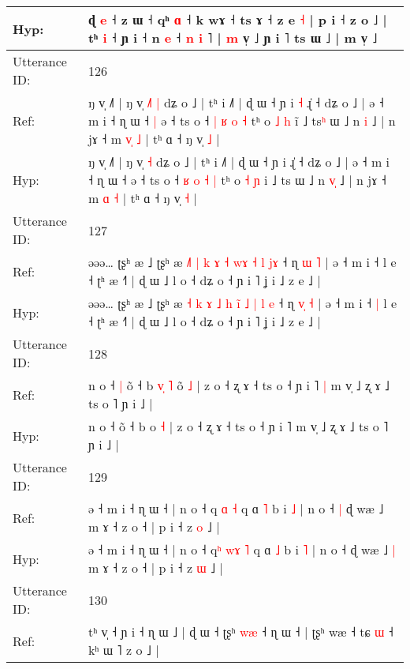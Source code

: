 \documentclass[10pt]{article}
\DeclareRobustCommand{\hl}[1]{{\textcolor{red}{#1}}}
\begin{document}
\begin{longtable}{ll}
 \\
Hyp: & ɖ \hl{e} ˧ z ɯ ˧\hl{}\hl{} qʰ \hl{}\hl{ɑ} ˧ k\hl{} wɤ ˧ ts ɤ ˧ z e \hl{˧} | p i ˧ z o ˩ | t\hl{}ʰ \hl{i} ˧ ɲ i ˧ n \hl{e} ˧\hl{ }\hl{n}\hl{ }\hl{i}\hl{ }˥ | \hl{m} v̩ ˩ ɲ i ˥ ts ɯ ˩ | m v̩ ˩
 \\
\midrule
Utterance ID: & 126 \\
Ref: & ŋ v̩ ˩˥ | ŋ v̩\hl{ }\hl{˩}\hl{˥} \hl{|} dʑ o ˩ | tʰ i ˩˥ | ɖ ɯ ˧ ɲ i\hl{ }\hl{˧} ɻ̍ ˧ dʑ o ˩ | ə ˧ m i ˧ ɳ ɯ ˧\hl{ }\hl{|} ə ˧ ts o ˧ \hl{|} \hl{ʁ} \hl{o} \hl{˧} tʰ o \hl{˩} \hl{h} i\hl{̃} ˩ ts\hl{ʰ} ɯ ˩ n \hl{}\hl{i} ˩ | n jɤ ˧ m \hl{v}\hl{̩} \hl{˩} | tʰ ɑ ˧ ŋ v̩ \hl{˩} |
 \\
Hyp: & ŋ v̩ ˩˥ | ŋ v̩\hl{}\hl{}\hl{} \hl{˧} dʑ o ˩ | tʰ i ˩˥ | ɖ ɯ ˧ ɲ i\hl{}\hl{} ɻ̍ ˧ dʑ o ˩ | ə ˧ m i ˧ ɳ ɯ ˧\hl{}\hl{} ə ˧ ts o ˧ \hl{ʁ} \hl{o} \hl{˧} \hl{|} tʰ o \hl{˧} \hl{ɲ} i\hl{} ˩ ts\hl{} ɯ ˩ n \hl{v}\hl{̩} ˩ | n jɤ ˧ m \hl{}\hl{ɑ} \hl{˧} | tʰ ɑ ˧ ŋ v̩ \hl{˧} |
 \\
\midrule
Utterance ID: & 127 \\
Ref: & əəə… ʈʂʰ æ ˩ ʈʂʰ æ \hl{˩}\hl{˥} \hl{|} \hl{k} \hl{ɤ} \hl{˧} \hl{w}\hl{ɤ} \hl{˧} \hl{l} \hl{}\hl{j}\hl{ɤ} ˧ ɳ \hl{}\hl{ɯ} \hl{˥} | ə ˧ m i ˧\hl{}\hl{} l e ˧ ʈʰ æ ˧˥ | ɖ ɯ ˩ l o ˧ dʑ o ˧ ɲ i ˥ ʝ i ˩ z e ˩ |
 \\
Hyp: & əəə… ʈʂʰ æ ˩ ʈʂʰ æ \hl{}\hl{˧} \hl{k} \hl{ɤ} \hl{˩} \hl{h} \hl{i}\hl{̃} \hl{˩} \hl{|} \hl{l}\hl{ }\hl{e} ˧ ɳ \hl{v}\hl{̩} \hl{˧} | ə ˧ m i ˧\hl{ }\hl{|} l e ˧ ʈʰ æ ˧˥ | ɖ ɯ ˩ l o ˧ dʑ o ˧ ɲ i ˥ ʝ i ˩ z e ˩ |
 \\
\midrule
Utterance ID: & 128 \\
Ref: & n o ˧\hl{ }\hl{|} õ ˧ b\hl{ }\hl{v}\hl{̩}\hl{ }\hl{˥} o\hl{̃} \hl{˩} | z o ˧ ʐ ɤ ˧ ts o ˧ ɲ i ˥\hl{ }\hl{|} m v̩ ˩ ʐ ɤ ˩ ts o ˥ ɲ i ˩ |
 \\
Hyp: & n o ˧\hl{}\hl{} õ ˧ b\hl{}\hl{}\hl{}\hl{}\hl{} o\hl{} \hl{˧} | z o ˧ ʐ ɤ ˧ ts o ˧ ɲ i ˥\hl{}\hl{} m v̩ ˩ ʐ ɤ ˩ ts o ˥ ɲ i ˩ |
 \\
\midrule
Utterance ID: & 129 \\
Ref: & ə ˧ m i ˧ ɳ ɯ ˧ | n o ˧ q\hl{} \hl{}\hl{ɑ} \hl{˧} q ɑ \hl{˥} b i \hl{˩} | n o ˧\hl{ }\hl{|} ɖ wæ ˩\hl{}\hl{} m ɤ ˧ z o ˧ | p i ˧ z \hl{o} ˩ |
 \\
Hyp: & ə ˧ m i ˧ ɳ ɯ ˧ | n o ˧ q\hl{ʰ} \hl{w}\hl{ɤ} \hl{˥} q ɑ \hl{˩} b i \hl{˥} | n o ˧\hl{}\hl{} ɖ wæ ˩\hl{ }\hl{|} m ɤ ˧ z o ˧ | p i ˧ z \hl{ɯ} ˩ |
 \\
\midrule
Utterance ID: & 130 \\
Ref: & tʰ v̩ ˧ ɲ i ˧ ɳ ɯ ˩ | ɖ ɯ ˧ ʈʂʰ\hl{ }\hl{w}\hl{æ} ˧ ɳ ɯ ˧ | ʈʂʰ wæ ˧ tɕ \hl{ɯ} ˧ kʰ ɯ ˥ z o ˩ |

\end{longtable}
\end{document}
